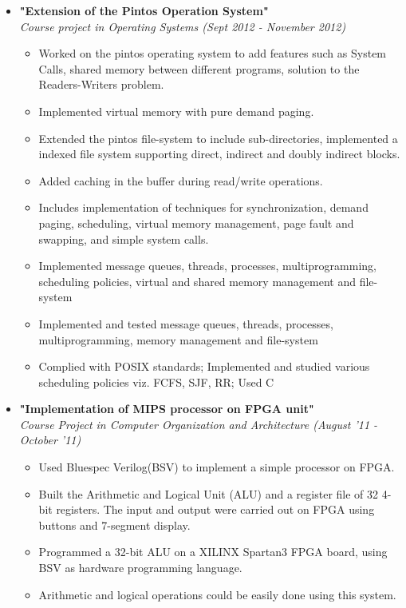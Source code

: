 \documentclass[margin,line]{resume}
\begin{document}
\begin{resume}
\begin{itemize}
  \item \large{\textbf{\textsf{"Extension of the Pintos Operation System"}}}
    \\ \small{\textit{Course project in Operating Systems (Sept 2012 - November 2012)}}
    \normalsize
    \begin{itemize}
    \item Worked on the pintos operating system to add features such as System Calls, shared memory between different programs, solution to the Readers-Writers problem.
    \item Implemented virtual memory with pure demand paging.
    \item Extended the pintos file-system to include sub-directories, implemented a indexed file system supporting direct, indirect and doubly indirect blocks.
    \item Added caching in the buffer during read/write operations.
    \item Includes implementation of techniques for synchronization, demand paging, scheduling, virtual memory management, page fault and swapping, and simple system calls.
    \item Implemented message queues, threads, processes, multiprogramming, scheduling policies, virtual and shared memory management and file-system
    \item Implemented and tested message queues, threads, processes, multiprogramming, memory management and file-system
    \item Complied with POSIX standards; Implemented and studied various scheduling policies viz. FCFS, SJF, RR; Used C
    \end{itemize}

  \item \large{\textbf{\textsf{"Implementation of MIPS processor on FPGA unit"}}}
    \\ \small{\textit{Course Project in Computer Organization and Architecture (August '11 - October '11)}}
    \normalsize
    \begin{itemize}
    \item Used Bluespec Verilog(BSV) to implement a simple processor on FPGA.
    \item Built the Arithmetic and Logical Unit (ALU) and a register file of 32 4-bit registers. The input and output were carried out on FPGA using buttons and 7-segment display.  
    \item Programmed a 32-bit ALU on a XILINX Spartan3 FPGA board, using BSV as hardware programming language.
    \item Arithmetic and logical operations could be easily done using this system.


\end{itemize}
\end{itemize}
\end{resume}
\end{document}
